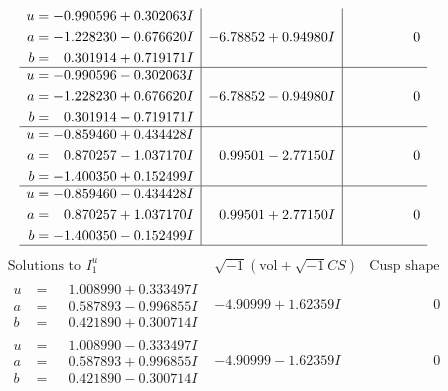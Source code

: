 \documentclass[1p]{elsarticle_modified}
\theoremstyle{definition}
\newcommand{\I}{\sqrt{-1}}
\begin{document}
$$\begin{array}{c|c|c}
\begin{aligned}
u &= -0.990596 + 0.302063 I \\
a &= -1.228230 - 0.676620 I \\
b &= \phantom{-}0.301914 + 0.719171 I\end{aligned}
 & -6.78852 + 0.94980 I & \phantom{-0.000000 } 0 \\ \hline\begin{aligned}
u &= -0.990596 - 0.302063 I \\
a &= -1.228230 + 0.676620 I \\
b &= \phantom{-}0.301914 - 0.719171 I\end{aligned}
 & -6.78852 - 0.94980 I & \phantom{-0.000000 } 0 \\ \hline\begin{aligned}
u &= -0.859460 + 0.434428 I \\
a &= \phantom{-}0.870257 - 1.037170 I \\
b &= -1.400350 + 0.152499 I\end{aligned}
 & \phantom{-}0.99501 - 2.77150 I & \phantom{-0.000000 } 0 \\ \hline\begin{aligned}
u &= -0.859460 - 0.434428 I \\
a &= \phantom{-}0.870257 + 1.037170 I \\
b &= -1.400350 - 0.152499 I\end{aligned}
 & \phantom{-}0.99501 + 2.77150 I & \phantom{-0.000000 } 0\\
 \hline 
 \end{array}$$\newpage$$\begin{array}{c|c|c}  
\text{Solutions to }I^u_{1}& \I (\text{vol} + \sqrt{-1}CS) & \text{Cusp shape}\\
 \hline 
\begin{aligned}
u &= \phantom{-}1.008990 + 0.333497 I \\
a &= \phantom{-}0.587893 - 0.996855 I \\
b &= \phantom{-}0.421890 + 0.300714 I\end{aligned}
 & -4.90999 + 1.62359 I & \phantom{-0.000000 } 0 \\ \hline\begin{aligned}
u &= \phantom{-}1.008990 - 0.333497 I \\
a &= \phantom{-}0.587893 + 0.996855 I \\
b &= \phantom{-}0.421890 - 0.300714 I\end{aligned}
 & -4.90999 - 1.62359 I & \phantom{-0.000000 } 0 \\ \hline\begin{aligned}

\end{aligned}
\end{array}$$
\end{document}
